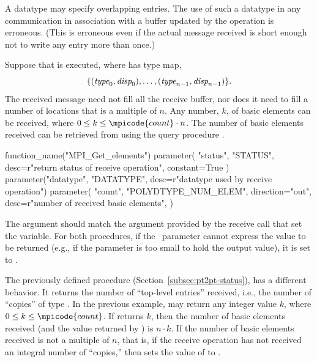A datatype may specify overlapping entries. The use of such a
datatype in any communication in association with a buffer updated by
the operation is erroneous. (This is erroneous even
if the actual message received is short enough not to write any entry
more than once.)

Suppose that
 is
executed, where  has type map,
\begin{displaymath}
\{(\textrm{\itshape{type}}_0, \textrm{\itshape{disp}}_0) ,\ldots,(\textrm{\itshape{type}}_{n-1}, \textrm{\itshape{disp}}_{n-1}) \}.
\end{displaymath}
The received message need not fill all the receive buffer, nor does it
need to fill a number of locations that is a multiple of $n$.
Any number, $k$, of basic
elements can be received, where $0 \le k \le \mpicode{count} \cdot n$.
The number of basic elements received can be retrieved from
 using the query procedure .

%
\begin{mpi-binding}
    function_name("MPI_Get_elements")
    parameter(
        "status", "STATUS", desc=r"return status of receive operation", constant=True
    )
    parameter("datatype", "DATATYPE", desc=r"datatype used by receive operation")
    parameter(
        "count",
        "POLYDTYPE_NUM_ELEM",
        direction="out",
        desc=r"number of received basic elements",
    )
\end{mpi-binding}

The  argument should match the argument provided by the
receive call that set the  variable.
For both procedures, if the \OUT\ parameter cannot express the value to
be returned (e.g., if the parameter is too small to hold the output
value), it is set to .

The previously defined procedure
(Section~\ref{subsec:pt2pt-status}),
has a different behavior.
It returns the number of ``top-level
entries'' received, i.e., the number of ``copies'' of type
.
In the previous example, 
may return any integer value $k$, where $0 \le k \le \mpicode{count}$.
If  returns $k$, then the number of basic
elements received (and the value returned by
)
is $n \cdot k$.   If the number of basic elements received is not a
multiple of $n$, that is, if the receive operation has not received an
integral number of  ``copies,'' then
 sets the value of  to .

